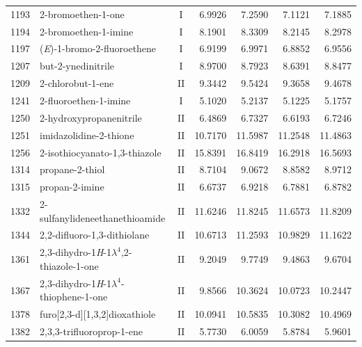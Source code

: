 \begin{longtable}{rlcd{2.5}d{2.5}d{2.5}d{2.5}}
    1193 & 2-bromoethen-1-one                                     & I  & 6.9926  & 7.2590  & 7.1121  & 7.1885  \\
    1194 & 2-bromoethen-1-imine                                   & I  & 8.1901  & 8.3309  & 8.2145  & 8.2978  \\
    1197 & (\textit{E})-1-bromo-2-fluoroethene                    & I  & 6.9199  & 6.9971  & 6.8852  & 6.9556  \\
    1207 & but-2-ynedinitrile                                     & I  & 8.9700  & 8.7923  & 8.6391  & 8.8477  \\
    1209 & 2-chlorobut-1-ene                                      & II & 9.3442  & 9.5424  & 9.3658  & 9.4678  \\
    1241 & 2-fluoroethen-1-imine                                  & I  & 5.1020  & 5.2137  & 5.1225  & 5.1757  \\
    1250 & 2-hydroxypropanenitrile                                & II & 6.4869  & 6.7327  & 6.6193  & 6.7246  \\
    1251 & imidazolidine-2-thione                                 & II & 10.7170 & 11.5987 & 11.2548 & 11.4863 \\
    1256 & 2-isothiocyanato-1,3-thiazole                          & II & 15.8391 & 16.8419 & 16.2918 & 16.5693 \\
    1314 & propane-2-thiol                                        & II & 8.7104  & 9.0672  & 8.8582  & 8.9712  \\
    1315 & propan-2-imine                                         & II & 6.6737  & 6.9218  & 6.7881  & 6.8782  \\
    1332 & 2-sulfanylideneethanethioamide                         & II & 11.6246 & 11.8245 & 11.6573 & 11.8209 \\
    1344 & 2,2-difluoro-1,3-dithiolane                            & II & 10.6713 & 11.2593 & 10.9829 & 11.1622 \\
    1361 & 2,3-dihydro-1\textit{H}-1$\lambda^4$,2-thiazole-1-one  & II & 9.2049  & 9.7749  & 9.4863  & 9.6704  \\
    1367 & 2,3-dihydro-1\textit{H}-1$\lambda^4$-thiophene-1-one   & II & 9.8566  & 10.3624 & 10.0723 & 10.2447 \\
    1378 & furo[2,3-d][1,3,2]dioxathiole                          & II & 10.0941 & 10.5835 & 10.3082 & 10.4969 \\
    1382 & 2,3,3-trifluoroprop-1-ene                              & II & 5.7730  & 6.0059  & 5.8784  & 5.9601  \\

\end{longtable}
